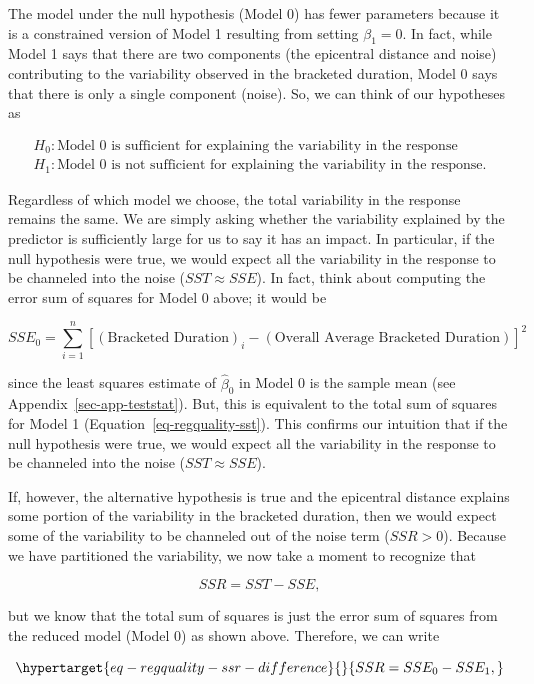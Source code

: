 \documentclass[
  letterpaper,
  DIV=11,
  numbers=noendperiod]{scrreprt}
\theoremstyle{plain}
\theoremstyle{definition}
\theoremstyle{definition}
\theoremstyle{remark}
\begin{document}
The model under the null hypothesis (Model 0) has fewer parameters
because it is a constrained version of Model 1 resulting from setting
\(\beta_1 = 0\). In fact, while Model 1 says that there are two
components (the epicentral distance and noise) contributing to the
variability observed in the bracketed duration, Model 0 says that there
is only a single component (noise). So, we can think of our hypotheses
as

\[
\begin{aligned}
  H_0: \text{Model 0 is sufficient for explaining the variability in the response} \\
  H_1: \text{Model 0 is not sufficient for explaining the variability in the response.}
\end{aligned}
\]

Regardless of which model we choose, the total variability in the
response remains the same. We are simply asking whether the variability
explained by the predictor is sufficiently large for us to say it has an
impact. In particular, if the null hypothesis were true, we would expect
all the variability in the response to be channeled into the noise
(\(SST \approx SSE\)). In fact, think about computing the error sum of
squares for Model 0 above; it would be

\[SSE_0 = \sum_{i=1}^{n} \left[(\text{Bracketed Duration})_i - (\text{Overall Average Bracketed Duration})\right]^2\]

since the least squares estimate of \(\widehat{\beta}_0\) in Model 0 is
the sample mean (see Appendix~\ref{sec-app-teststat}). But, this is
equivalent to the total sum of squares for Model 1
(Equation~\ref{eq-regquality-sst}). This confirms our intuition that if
the null hypothesis were true, we would expect all the variability in
the response to be channeled into the noise (\(SST \approx SSE\)).

If, however, the alternative hypothesis is true and the epicentral
distance explains some portion of the variability in the bracketed
duration, then we would expect some of the variability to be channeled
out of the noise term (\(SSR > 0\)). Because we have partitioned the
variability, we now take a moment to recognize that

\[SSR = SST - SSE,\]

but we know that the total sum of squares is just the error sum of
squares from the reduced model (Model 0) as shown above. Therefore, we
can write

\begin{equation}\protect\hypertarget{eq-regquality-ssr-difference}{}{SSR = SSE_0 - SSE_1,}\label{eq-regquality-ssr-difference}\end{equation}
\end{document}
